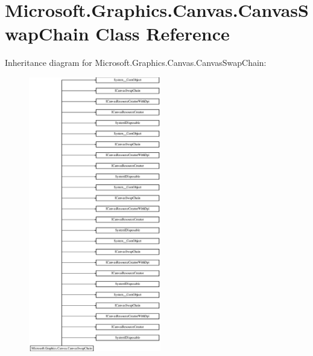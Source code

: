 \hypertarget{class_microsoft_1_1_graphics_1_1_canvas_1_1_canvas_swap_chain}{}\section{Microsoft.\+Graphics.\+Canvas.\+Canvas\+Swap\+Chain Class Reference}
\label{class_microsoft_1_1_graphics_1_1_canvas_1_1_canvas_swap_chain}
Inheritance diagram for Microsoft.\+Graphics.\+Canvas.\+Canvas\+Swap\+Chain\+:\begin{figure}[H]
\begin{center}
\leavevmode
\includegraphics[height=12.000000cm]{class_microsoft_1_1_graphics_1_1_canvas_1_1_canvas_swap_chain}
\end{center}
\end{figure}
